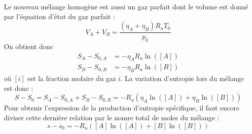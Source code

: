 Le nouveau mélange homogène est aussi un gaz parfait dont le volume est donné par l'équation d'état du gaz parfait :
\begin{equation} V_A + V_B = \frac{(\eta_A+\eta_B)R_uT_0}{p_0} \end{equation}
On obtient donc 
\begin{align} S_A - S_{0,A} &= -\eta_AR_u\ln\left(\left[A\right]\right) \\ S_B - S_{0,B} &= -\eta_BR_u\ln\left(\left[B\right]\right)\end{align}
où $\left[i\right]$ est la fraction molaire du gaz $i$. La variation d'entropie lors du mélange est donc :
\begin{equation} S-S_0 = S_A - S_{0,A} + S_B - S_{0,B} = -R_u\left(\eta_A\ln\left(\left[A\right]\right) + \eta_B\ln\left(\left[B\right]\right)\right) \end{equation}
Pour obtenir l'expression de la production d'entropie spécifique, il faut encore diviser cette dernière relation par le nomre total de moles du mélange :
\begin{equation} s-s_0 =  -R_u\left(\left[A\right]\ln\left(\left[A\right]\right) + \left[B\right]\ln\left(\left[B\right]\right)\right) \end{equation}
